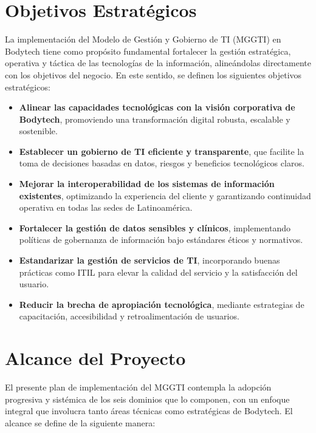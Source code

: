 \section{Objetivos Estratégicos}

La implementación del Modelo de Gestión y Gobierno de TI (MGGTI) en Bodytech tiene como propósito fundamental fortalecer la gestión estratégica, operativa y táctica de las tecnologías de la información, alineándolas directamente con los objetivos del negocio. En este sentido, se definen los siguientes objetivos estratégicos:

\begin{itemize}
    \item \textbf{Alinear las capacidades tecnológicas con la visión corporativa de Bodytech}, promoviendo una transformación digital robusta, escalable y sostenible.
    \item \textbf{Establecer un gobierno de TI eficiente y transparente}, que facilite la toma de decisiones basadas en datos, riesgos y beneficios tecnológicos claros.
    \item \textbf{Mejorar la interoperabilidad de los sistemas de información existentes}, optimizando la experiencia del cliente y garantizando continuidad operativa en todas las sedes de Latinoamérica.
    \item \textbf{Fortalecer la gestión de datos sensibles y clínicos}, implementando políticas de gobernanza de información bajo estándares éticos y normativos.
    \item \textbf{Estandarizar la gestión de servicios de TI}, incorporando buenas prácticas como ITIL para elevar la calidad del servicio y la satisfacción del usuario.
    \item \textbf{Reducir la brecha de apropiación tecnológica}, mediante estrategias de capacitación, accesibilidad y retroalimentación de usuarios.
\end{itemize}

\section{Alcance del Proyecto}

El presente plan de implementación del MGGTI contempla la adopción progresiva y sistémica de los seis dominios que lo componen, con un enfoque integral que involucra tanto áreas técnicas como estratégicas de Bodytech. El alcance se define de la siguiente manera:

